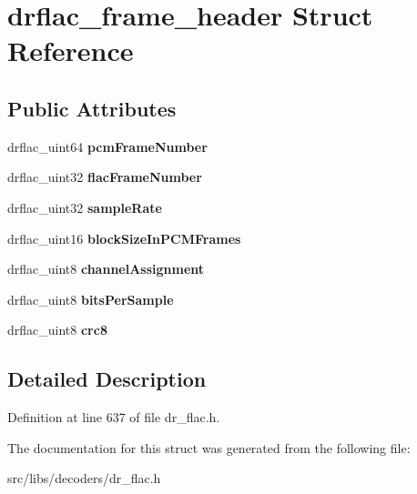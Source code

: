\hypertarget{structdrflac__frame__header}{\section{drflac\-\_\-frame\-\_\-header Struct Reference}
\label{structdrflac__frame__header}
}
\subsection*{Public Attributes}
\begin{DoxyCompactItemize}
\item 
\hypertarget{structdrflac__frame__header_ad88f42b0701514e5ea5dfe4e02607e84}{drflac\-\_\-uint64 {\bfseries pcm\-Frame\-Number}}\label{structdrflac__frame__header_ad88f42b0701514e5ea5dfe4e02607e84}

\item 
\hypertarget{structdrflac__frame__header_a6bf5c5a4487b2e24625169cc6d901c37}{drflac\-\_\-uint32 {\bfseries flac\-Frame\-Number}}\label{structdrflac__frame__header_a6bf5c5a4487b2e24625169cc6d901c37}

\item 
\hypertarget{structdrflac__frame__header_a2c3c2beeeb4bd55b7162db6b4057607d}{drflac\-\_\-uint32 {\bfseries sample\-Rate}}\label{structdrflac__frame__header_a2c3c2beeeb4bd55b7162db6b4057607d}

\item 
\hypertarget{structdrflac__frame__header_a17e61d0eb9b14de00bf98c44f8f250e6}{drflac\-\_\-uint16 {\bfseries block\-Size\-In\-P\-C\-M\-Frames}}\label{structdrflac__frame__header_a17e61d0eb9b14de00bf98c44f8f250e6}

\item 
\hypertarget{structdrflac__frame__header_aef08e4c6301bb16e445872fefe68ee66}{drflac\-\_\-uint8 {\bfseries channel\-Assignment}}\label{structdrflac__frame__header_aef08e4c6301bb16e445872fefe68ee66}

\item 
\hypertarget{structdrflac__frame__header_af4f22f5d0e8ba8e81e665508923badce}{drflac\-\_\-uint8 {\bfseries bits\-Per\-Sample}}\label{structdrflac__frame__header_af4f22f5d0e8ba8e81e665508923badce}

\item 
\hypertarget{structdrflac__frame__header_ae4dcca09d798cc45ff09765d71d31523}{drflac\-\_\-uint8 {\bfseries crc8}}\label{structdrflac__frame__header_ae4dcca09d798cc45ff09765d71d31523}

\end{DoxyCompactItemize}


\subsection{Detailed Description}


Definition at line 637 of file dr\-\_\-flac.\-h.



The documentation for this struct was generated from the following file\-:\begin{DoxyCompactItemize}
\item 
src/libs/decoders/dr\-\_\-flac.\-h\end{DoxyCompactItemize}
